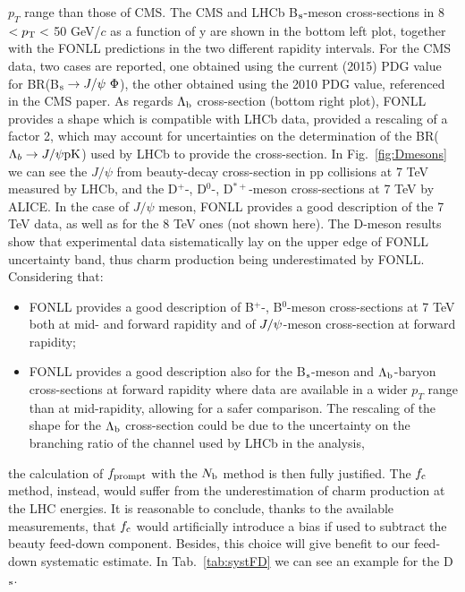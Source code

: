 $p_{T}$ range than those of CMS.
The CMS and LHCb B$_{\rm s}$-meson cross-sections in 
8 $< p_{\rm T} <$ 50 GeV/$c$ as a function of y are shown in 
the bottom left plot, together with the FONLL predictions in the 
two different rapidity intervals. For the CMS data, two cases are 
reported, one obtained using the current (2015) PDG value for 
BR(B$_{\rm s} \rightarrow J/{\rm \psi} ~\Phi$),
the other obtained using the 2010 PDG value, referenced in the 
CMS paper. As regards $\Lambda_{\rm b}$ cross-section 
(bottom right plot), FONLL provides a shape which is compatible
 with LHCb data, provided a rescaling of a factor 2, which may account
  for uncertainties on the determination of the BR($\Lambda_{b} \rightarrow J/\psi {\rm p K}$) 
  used by LHCb to provide the cross-section.
In Fig.~\ref{fig:Dmesons} we can see the $J/\psi$ from beauty-decay 
cross-section in pp collisions at 7 TeV measured by LHCb, and the 
D$^{+}$-, D$^{0}$-, D$^{*+}$-meson cross-sections at 7 TeV by ALICE.
In the case of $J/\psi$ meson, FONLL provides a good description of 
the 7 TeV data, as well as for the 8 TeV ones (not shown here). 
The D-meson results show that 
experimental data sistematically lay on the upper edge of FONLL uncertainty 
band, thus charm production being underestimated by FONLL.\\
Considering that:
\begin{itemize}
\item FONLL provides a good description of B$^{+}$-, B$^{0}$-meson 
cross-sections at 7 TeV both at mid- and forward rapidity and of 
$J/{\rm \psi}$-meson cross-section at forward rapidity;
\item FONLL provides a good description also for the 
B$_{\rm s}$-meson and $\Lambda_{\rm b}$-baryon cross-sections 
at forward rapidity where data are available in a wider $p_{T}$ range 
than at mid-rapidity, allowing for a safer comparison. The rescaling 
of the shape for the $\Lambda_{\rm b}$ cross-section could be due 
to the uncertainty on the branching ratio
of the channel used by LHCb in the analysis,
\end{itemize}
the calculation of $f_{\rm prompt}$ with the $N_{\rm b}$ method is then fully justified.
The $f_{\rm c}$ method, instead, would suffer from the 
underestimation of charm production at the
LHC energies. It is reasonable to conclude, thanks to the available 
measurements, that $f_{\rm c}$ would artificially introduce a bias if 
used to subtract the beauty feed-down component.
Besides, this choice will give benefit to our feed-down systematic 
estimate. In Tab.~\ref{tab:systFD} we can see an example for the D$_{\rm s}$.

